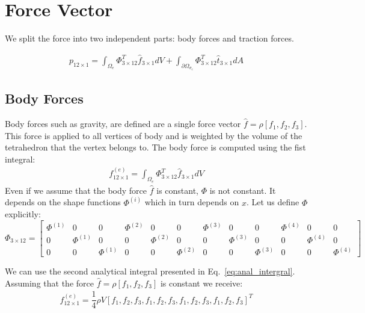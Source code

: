 \documentclass[en]{minipw} %
\begin{document}
\section{Force Vector}
We split the force into two independent parts: body forces and traction forces.

\begin{equation}
\begin{aligned}
p_{12 \times 1} = \int_{\Omega_{e}} \Phi_{3 \times 12}^{T} \hat{f}_{3 \times 1} dV + \int_{\partial \Omega_{\sigma_{e}}} \Phi_{3 \times 12}^{T} \hat{t}_{3 \times 1} dA
\end{aligned}
\end{equation}

\subsection{Body Forces}
Body forces such as gravity, are defined are a single force vector $\hat{f} = \rho[f_1, f_2, f_3]$. This force is applied to all vertices of body and is weighted by the volume of the tetrahedron that the vertex belongs to.
The body force is computed using the fist integral:
\begin{equation}
\begin{aligned}
f^{(e)}_{12 \times 1} = \int_{\Omega_{e}} \Phi_{3 \times 12}^{T} \hat{f}_{3 \times 1} dV
\end{aligned}
\end{equation}
Even if we assume that the body force $\hat{f}$ is constant, $\Phi$ is not constant. It depends on the shape functions $\Phi^{(i)}$ which in turn depends on $x$. Let us define $\Phi$ explicitly:
\begin{equation}
\label{eq:geometric_matrix}
\Phi_{3 \times 12} =
\begin{bmatrix}
\Phi^{(1)} & 0 & 0 & \Phi^{(2)} & 0 & 0 & \Phi^{(3)} & 0 & 0 & \Phi^{(4)} & 0 & 0 \\
0 & \Phi^{(1)} & 0 & 0 & \Phi^{(2)} & 0 & 0 & \Phi^{(3)} & 0 & 0 & \Phi^{(4)} & 0 \\
0 & 0 & \Phi^{(1)} & 0 & 0 & \Phi^{(2)} & 0 & 0 & \Phi^{(3)} & 0 & 0 & \Phi^{(4)} 
\end{bmatrix}
\end{equation}

We can use the second analytical integral presented in Eq.~\ref{eq:anal_intergral}. Assuming that the force $\hat{f} = \rho[f_1, f_2, f_3]$ is constant we receive:
\begin{equation}
\begin{aligned}
f^{(e)}_{12 \times 1} = \dfrac{1}{4} \rho V [f_1, f_2, f_3, f_1, f_2, f_3, f_1, f_2, f_3,f_1, f_2, f_3]^{T} 
\end{aligned}
\end{equation}
\end{document}
